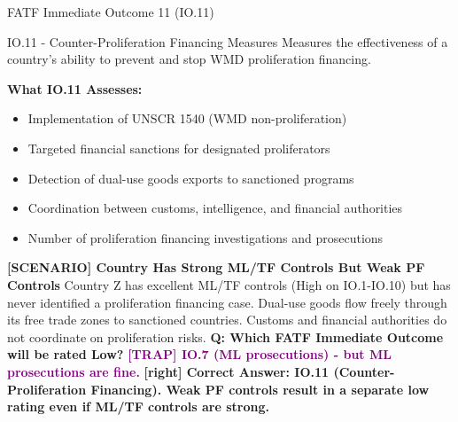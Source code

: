 \documentclass[11pt,a4paper]{beamer}
\newcommand{\trap}[1]{\textcolor{purple}{\textbf{[TRAP] #1}}}
\newcommand{\correct}[1]{\textcolor{green!50!black}{\textbf{[right] #1}}}
\newcommand{\scenario}[1]{\textcolor{blue!70!black}{\textbf{[SCENARIO] #1}}}
\begin{document}

\begin{frame}{FATF Immediate Outcome 11 (IO.11)}
\begin{block}{IO.11 - Counter-Proliferation Financing Measures}
Measures the effectiveness of a country's ability to prevent and stop WMD proliferation financing.
\end{block}
\textbf{What IO.11 Assesses:}
\begin{itemize}
\item Implementation of UNSCR 1540 (WMD non-proliferation)
\item Targeted financial sanctions for designated proliferators
\item Detection of dual-use goods exports to sanctioned programs
\item Coordination between customs, intelligence, and financial authorities
\item Number of proliferation financing investigations and prosecutions
\end{itemize}
\scenario{Country Has Strong ML/TF Controls But Weak PF Controls}
Country Z has excellent ML/TF controls (High on IO.1-IO.10) but has never identified a proliferation financing case. Dual-use goods flow freely through its free trade zones to sanctioned countries. Customs and financial authorities do not coordinate on proliferation risks.
\vspace{0.2cm}
\textbf{Q: Which FATF Immediate Outcome will be rated Low?}
\trap{IO.7 (ML prosecutions) - but ML prosecutions are fine.}
\correct{Correct Answer: IO.11 (Counter-Proliferation Financing). Weak PF controls result in a separate low rating even if ML/TF controls are strong.}
\end{frame}

\end{document}
